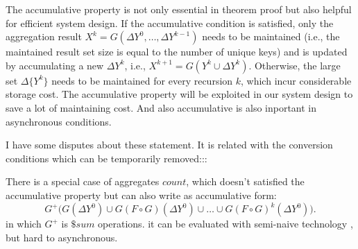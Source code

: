 {




The accumulative property is not only essential in theorem proof but also helpful for efficient system design. If the accumulative condition is satisfied, only the aggregation result $X^k=G(\Delta Y^{0},\ldots,\Delta Y^{k-1})$ needs to be maintained (i.e., the maintained result set size is equal to the number of unique keys) and is updated by accumulating a new $\Delta Y^{k}$, i.e., $X^{k+1}=G(Y^k \cup \Delta Y^k)$. Otherwise, the large set $\Delta \{Y^{k}\}$ needs to be maintained for every recursion $k$, which incur considerable storage cost. The accumulative property will be exploited in our system design to save a lot of maintaining cost. And also accumulative is also inportant in asynchronous conditions.

{\color{blue}
I have some disputes about these statement. It is related with the conversion conditions which can be temporarily removed:::	
	
	
There is a special case of aggregates $count$, which doesn't satisfied the accumulative property but can also write as accumulative form:
\begin{equation}
\label{eq:accumasyncres}
G^+\Big(G(\Delta Y^0)\cup G(F\circ G)(\Delta Y^0)\cup\ldots\cup G(F\circ G)^k(\Delta Y^0)\Big).
\end{equation}
in which $G^+$ is $\$sum$ operations. it can be evaluated with semi-naive technology , but hard to asynchronous.
}

}
